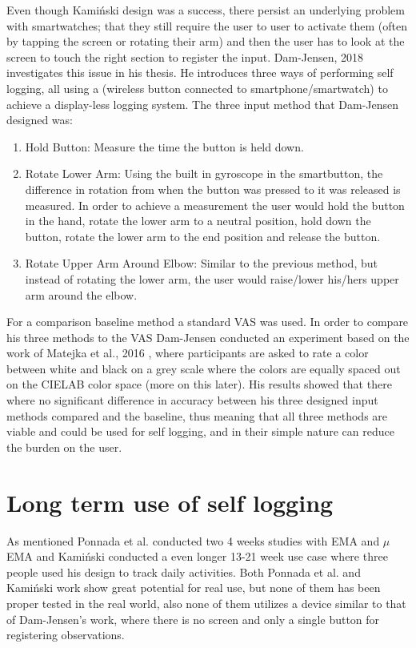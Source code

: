 Even though Kami\'nski design was a success, there persist an underlying problem with smartwatches; that they still require the user to user to activate them (often by tapping the screen or rotating their arm) and then the user has to look at the screen to touch the right section to register the input. Dam-Jensen, 2018\cite{dam} investigates this issue in his thesis. He introduces three ways of performing self logging, all using a  (wireless button connected to smartphone/smartwatch) to achieve a display-less logging system. The three input method that Dam-Jensen designed was:

\begin{enumerate}
	\item Hold Button: Measure the time the button is held down.
	\item Rotate Lower Arm: Using the built in gyroscope in the smartbutton, the difference in rotation from when the button was pressed to it was released is measured. In order to achieve a measurement the user would hold the button in the hand, rotate the lower arm to a neutral position, hold down the button, rotate the lower arm to the end position and release the button. 
	\item Rotate Upper Arm Around Elbow: Similar to the previous method, but instead of rotating the lower arm, the user would raise/lower his/hers upper arm around the elbow.
\end{enumerate}

For a comparison baseline method a standard VAS was used. In order to compare his three methods to the VAS Dam-Jensen conducted an experiment based on the work of Matejka et al., 2016 \cite{grey}, where participants are asked to rate a color between white and black on a grey scale where the colors are equally spaced out on the CIELAB color space\cite{cielab} (more on this later). His results showed that there where no significant difference in accuracy between his three designed input methods compared and the baseline, thus meaning that all three methods are viable and could be used for self logging, and in their simple nature can reduce the burden on the user.

\section{Long term use of self logging}
As mentioned Ponnada et al. conducted two 4 weeks studies with EMA and $\mu$EMA and Kami\'nski conducted a even longer 13-21 week use case where three people used his design to track daily activities. Both Ponnada et al. and Kami\'nski work show great potential for real use, but none of them has been proper tested in the real world, also none of them utilizes a device similar to that of Dam-Jensen's work, where there is no screen and only a single button for registering observations.

